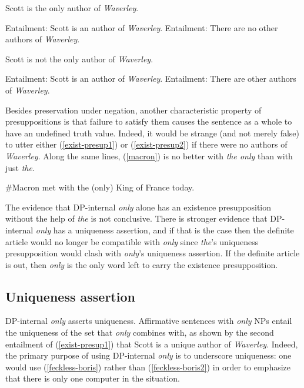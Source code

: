 \begin{exe}
	\ex \label{exist-presup1} Scott is the only author of \textit{Waverley}.
		\begin{xlist}
			\ex Entailment: Scott is an author of \textit{Waverley}.
			\ex Entailment: There are no other authors of \textit{Waverley}.
		\end{xlist}
	\ex \label{exist-presup2} Scott is not the only author of \textit{Waverley}.
		\begin{xlist}
			\ex Entailment: Scott is an author of \textit{Waverley}.
			\ex Entailment: There are other authors of \textit{Waverley}.
		\end{xlist}
\end{exe}

Besides preservation under negation, another characteristic property of presuppositions is that failure to satisfy them causes the sentence as a whole to have an undefined truth value. Indeed, it would be strange (and not merely false) to utter either (\ref{exist-presup1}) or (\ref{exist-presup2}) if there were no authors of \textit{Waverley}. Along the same lines, (\ref{macron}) is no better with \textit{the only} than with just \textit{the}.

\begin{exe}
	\ex \label{macron} \#Macron met with the (only) King of France today.
\end{exe}

The evidence that DP-internal \textit{only} alone has an existence presupposition without the help of \textit{the} is not conclusive. There is stronger evidence that DP-internal \textit{only} has a uniqueness assertion, and if that is the case then the definite article would no longer be compatible with \textit{only} since \textit{the}'s uniqueness presupposition would clash with \textit{only}'s uniqueness assertion. If the definite article is out, then \textit{only} is the only word left to carry the existence presupposition.

\subsection{Uniqueness assertion}
DP-internal \textit{only} asserts uniqueness. Affirmative sentences with \textit{only} NPs entail the uniqueness of the set that \textit{only} combines with, as shown by the second entailment of (\ref{exist-presup1}) that Scott is a unique author of \textit{Waverley}. Indeed, the primary purpose of using DP-internal \textit{only} is to underscore uniqueness: one would use (\ref{feckless-boris}) rather than (\ref{feckless-boris2}) in order to emphasize that there is only one computer in the situation.

